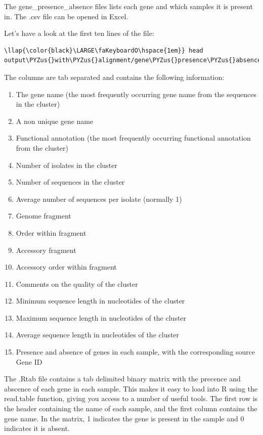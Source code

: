 \documentclass[11pt]{article}
\providecommand{\tightlist}{%
      \setlength{\itemsep}{0pt}\setlength{\parskip}{0pt}}
\def\PYZus{\char`\_}
\begin{document}
The gene\_presence\_absence files lists each gene and which samples it
is present in. The .csv file can be opened in Excel.

Let's have a look at the first ten lines of the file:

\begin{terminalinput}
\begin{Verbatim}[commandchars=\\\{\}]
\llap{\color{black}\LARGE\faKeyboardO\hspace{1em}} head output\PYZus{}with\PYZus{}alignment/gene\PYZus{}presence\PYZus{}absence.csv
\end{Verbatim}
\end{terminalinput}

    The columns are tab separated and contains the following information:

\begin{enumerate}
\def\labelenumi{\arabic{enumi}.}
\tightlist
\item
  The gene name (the most frequently occurring gene name from the
  sequences in the cluster)
\item
  A non unique gene name
\item
  Functional annotation (the most frequently occurring functional
  annotation from the cluster)
\item
  Number of isolates in the cluster
\item
  Number of sequences in the cluster
\item
  Average number of sequences per isolate (normally 1)
\item
  Genome fragment
\item
  Order within fragment
\item
  Accessory fragment
\item
  Accessory order within fragment
\item
  Comments on the quality of the cluster
\item
  Minimum sequence length in nucleotides of the cluster
\item
  Maximum sequence length in nucleotides of the cluster
\item
  Average sequence length in nucleotides of the cluster
\item
  Presence and absence of genes in each sample, with the corresponding
  source Gene ID
\end{enumerate}

The .Rtab file contains a tab delimited binary matrix with the precence
and abscence of each gene in each sample. This makes it easy to load
into R using the read.table function, giving you access to a number of
useful tools. The first row is the header containing the name of each
sample, and the first column contains the gene name. In the matrix, 1
indicates the gene is present in the sample and 0 indicates it is
absent.
\end{document}
